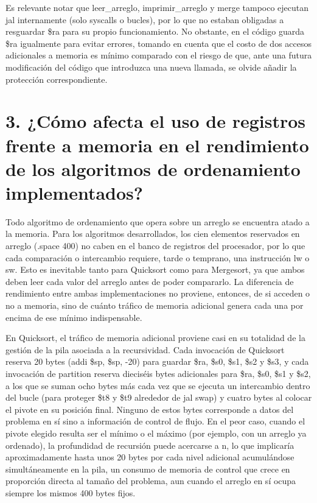 \documentclass[12pt, letterpaper]{article}
\begin{document}
Es relevante notar que leer\_arreglo, imprimir\_arreglo y merge tampoco ejecutan jal internamente (solo syscalls o bucles), por lo que no estaban obligadas a resguardar \$ra para su propio funcionamiento. No obstante, en el código guarda \$ra igualmente para evitar errores, tomando en cuenta que el costo de dos accesos adicionales a memoria es mínimo comparado con el riesgo de que, ante una futura modificación del código que introduzca una nueva llamada, se olvide añadir la protección correspondiente.\newpage

\section*{3. ¿Cómo afecta el uso de registros frente a memoria en el rendimiento de los algoritmos de ordenamiento implementados?}

Todo algoritmo de ordenamiento que opera sobre un arreglo se encuentra atado a la memoria. Para los algoritmos desarrollados, los cien elementos reservados en arreglo (.space 400) no caben en el banco de registros del procesador, por lo que cada comparación o intercambio requiere, tarde o temprano, una instrucción lw o sw. Esto es inevitable tanto para Quicksort como para Mergesort, ya que ambos deben leer cada valor del arreglo antes de poder compararlo. La diferencia de rendimiento entre ambas implementaciones no proviene, entonces, de si acceden o no a memoria, sino de cuánto tráfico de memoria adicional genera cada una por encima de ese mínimo indispensable.

En Quicksort, el tráfico de memoria adicional proviene casi en su totalidad de la gestión de la pila asociada a la recursividad. Cada invocación de Quicksort reserva 20 bytes (addi \$sp, \$sp, -20) para guardar \$ra, \$s0, \$s1, \$s2 y \$s3, y cada invocación de partition reserva dieciséis bytes adicionales para \$ra, \$s0, \$s1 y \$s2, a los que se suman ocho bytes más cada vez que se ejecuta un intercambio dentro del bucle (para proteger \$t8 y \$t9 alrededor de jal swap) y cuatro bytes al colocar el pivote en su posición final. Ninguno de estos bytes corresponde a datos del problema en sí sino a información de control de flujo. En el peor caso, cuando el pivote elegido resulta ser el mínimo o el máximo (por ejemplo, con un arreglo ya ordenado), la profundidad de recursión puede acercarse a n, lo que implicaría aproximadamente hasta unos 20 bytes por cada nivel adicional acumulándose simultáneamente en la pila, un consumo de memoria de control que crece en proporción directa al tamaño del problema, aun cuando el arreglo en sí ocupa siempre los mismos 400 bytes fijos.
\end{document}
